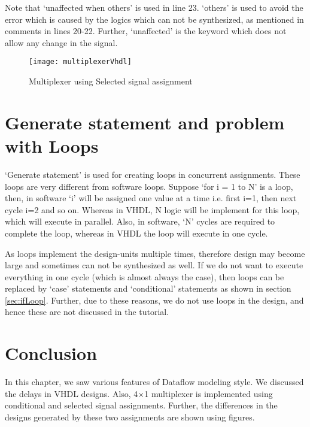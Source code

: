 Note that `unaffected when others' is used in line 23.  `others' is used to avoid the error which is caused by the logics which can not be synthesized,  as mentioned in comments in lines 20-22. Further, `unaffected' is the keyword which does not allow any change in the signal.

\begin{figure}[!h]
	\centering
	\texttt{[image: multiplexerVhdl]}
	\caption{Multiplexer using Selected signal assignment}
	\label{fig:multiplexerVhdl}
\end{figure}



\section{Generate statement and problem with Loops}

`Generate statement' is used for creating loops in concurrent assignments. These loops are very different from software loops. Suppose `for i = 1 to N' is a loop, then, in software `i' will be assigned one value at a time i.e. first i=1, then next cycle i=2 and so on. Whereas in VHDL, N logic will be implement for this loop, which will execute in parallel. Also, in software, `N' cycles are required to complete the loop, whereas in VHDL the loop will execute in one cycle. 
\begin{noNumBox}
	As loops implement the design-units multiple times, therefore design may become large and sometimes can not be synthesized as well. If we do not want to execute everything in one cycle (which is almost always the case), then loops can be replaced by `case' statements and `conditional' statements as shown in section \ref{sec:ifLoop}. Further, due to these reasons, we do not use loops in the design, and hence these are not discussed in the tutorial.
\end{noNumBox}   

\section{Conclusion}
In this chapter, we saw various features of Dataflow modeling style. We discussed the delays in VHDL designs. Also, 4$\times$1 multiplexer is implemented using conditional and selected signal assignments. Further, the differences in the designs generated by these two assignments are shown using figures.